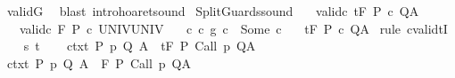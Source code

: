 \begin{isabellebody}
\isamarkupfalse%
\ validG\ \isamarkupfalse%
\ {\isacharparenleft}blast\ intro{\isacharcolon}hoaret{\isacharunderscore}sound{\isacharparenright}\isanewline
{}\isamarkupfalse%
%
\endisatagproof
{\isafoldproof}%
%
\isadelimproof
%
\endisadelimproof
%
\isamarkuptrue%
\isamarkupfalse%
\ SplitGuards{\isacharunderscore}sound{\isacharcolon}\isanewline
\ \ \ valid{\isacharunderscore}c{}{\isacharcolon}\ {\isachardoublequoteopen}{\isasymGamma}{\isacharcomma}{\isasymTheta}{\isasymTurnstile}\isactrlsub t\isactrlbsub {\isacharslash}F\isactrlesub \ P\ c\ Q{\isacharcomma}A{\isachardoublequoteclose}\isanewline
\ \ \ valid{\isacharunderscore}c{}{\isacharcolon}\ {\isachardoublequoteopen}{\isasymGamma}{\isacharcomma}{\isasymTheta}{\isasymTurnstile}\isactrlbsub {\isacharslash}F\isactrlesub \ P\ c\ UNIV{\isacharcomma}UNIV{\isachardoublequoteclose}\isanewline
\ \ \ c{\isacharcolon}\ {\isachardoublequoteopen}{\isacharparenleft}c\ {\isasyminter}\isactrlsub g\ c\ {\isacharequal}\ Some\ c{\isachardoublequoteclose}\isanewline
\ \ \ {\isachardoublequoteopen}{\isasymGamma}{\isacharcomma}{\isasymTheta}{\isasymTurnstile}\isactrlsub t\isactrlbsub {\isacharslash}F\isactrlesub \ P\ c\ Q{\isacharcomma}A{\isachardoublequoteclose}\isanewline
%
\isadelimproof
%
\endisadelimproof
%
\isatagproof
{}\isamarkupfalse%
\ {\isacharparenleft}rule\ cvalidtI{\isacharparenright}\isanewline
\ \ \isamarkupfalse%
\ s\ t\isanewline
\ \ \isamarkupfalse%
\ ctxt{\isacharcolon}\ {\isachardoublequoteopen}{\isasymforall}{\isacharparenleft}P{\isacharcomma}\ p{\isacharcomma}\ Q{\isacharcomma}\ A{\isacharparenright}{\isasymin}{\isasymTheta}{\isachardot}\ {\isasymGamma}\ {\isasymTurnstile}\isactrlsub t\isactrlbsub {\isacharslash}F\isactrlesub \ P\ {\isacharparenleft}Call\ p{\isacharparenright}\ Q{\isacharcomma}A{\isachardoublequoteclose}\isanewline
\ \ \isamarkupfalse%
\ ctxt{\isacharprime}{\isacharcolon}\ {\isachardoublequoteopen}{\isasymforall}{\isacharparenleft}P{\isacharcomma}\ p{\isacharcomma}\ Q{\isacharcomma}\ A{\isacharparenright}{\isasymin}{\isasymTheta}{\isachardot}\ {\isasymGamma}\ {\isasymTurnstile}\isactrlbsub {\isacharslash}F\isactrlesub \ P\ {\isacharparenleft}Call\ p{\isacharparenright}\ Q{\isacharcomma}A{\isachardoublequoteclose}\ \isanewline

\end{isabellebody}
